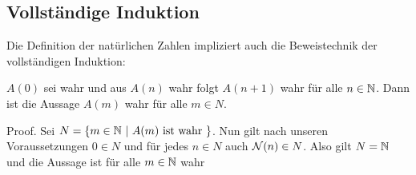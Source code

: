 \subsection{Vollständige Induktion}
\label{\detokenize{grundlagen/zahlensysteme:vollstandige-induktion}}
Die Definition der natürlichen Zahlen impliziert auch die Beweistechnik der vollständigen Induktion:
\label{grundlagen/zahlensysteme:theorem-1}
\begin{theorem}{}{}



\(A(0)\) sei wahr und aus \(A(n)\) wahr folgt \(A(n+1)\) wahr für alle \(n \in \mathbb{N}\). Dann ist die Aussage \(A(m)\) wahr für alle \(m \in N\).
\end{theorem}

\begin{emphBox}{}{}
Proof.  Sei \(N=\{m \in \mathbb{N}~|~A(m) \text{ ist wahr }\}\). Nun gilt nach unseren Voraussetzungen \(0 \in N\) und für jedes \(n \in N\) auch \({\cal N}(n) \in N\). Also gilt \(N= \mathbb{N}\) und die Aussage ist für alle \(m \in \mathbb{N}\) wahr
\end{emphBox}

